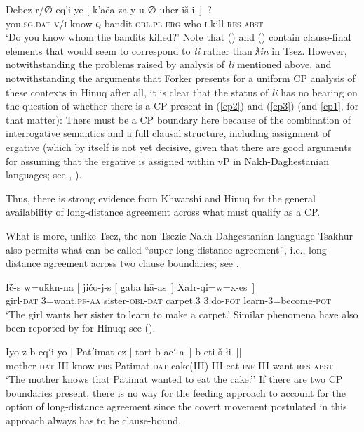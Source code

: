 \documentclass[output=paper
,modfonts
,nonflat]{langsci/langscibook}
\begin{document}
	\ea\label{ex:mueller:20} \label{cp3}
	\gll Debez r/∅-eq'i-ye [ k'a\v{c}a\textgamma -za-y \textbeltl u ∅-uher-i\v{s}-\textbeltl i~]~? \\
	you.{\scshape sg.dat} {\scshape v/i}-know-{\scshape q} {} bandit-{\scshape obl.pl-erg}   who {\scshape i}-kill-{\scshape res-abst} \\ 
	\glt `Do you know whom the bandits killed?'
	\z
	Note that (\LLast) and (\Last) contain clause-final elements that
	would seem to correspond to {\itshape {\l}i} rather than  {\it
		ƛin} in Tsez. However, notwithstanding the problems
	raised by  analysis of {\itshape {\l}i}
	mentioned above, and not\-withstanding the arguments that Forker
	presents for a uniform CP analysis of these contexts in Hinuq after
	all, it is clear that the status of {\itshape {\l}i} has no bearing on the
	question of whether there is a CP present in (\ref{cp2}) and (\ref{cp3})
	(and \ref{cp1}, for that matter): There must be a CP boundary here
	because of the combination of interrogative semantics and a full
	clausal structure, including assignment of ergative (which by itself
	is not yet decisive, given that there are good arguments for assuming
	that the ergative is assigned within vP in Nakh-Daghestanian
	languages; see \citealt{Gagliardietal:14}, \citealt{Polinsky:16:arc}). 
	
	Thus, there is strong evidence from Khwarshi and Hinuq for the general
	availability of long-distance agreement across what must qualify as a
	CP.
	
	What is more, unlike Tsez, the non-Tsezic Nakh-Dahgestanian language
	Tsakhur  also permits what can be called
	``super-long-distance agreement'', i.e., long-distance agreement 
	across two clause boundaries; see \citet{Kibrik:99}.
	
	\ea\label{ex:mueller:21} \label{tsa1}
	\gll I\v{c}\={\textsci}-s w=u\={k}\={\textsci}k\textbari n-na [ ji\v{c}o-j-s [ gaba  h\={a}\textglotstop-as~] XaIr-qi=w=x-es~] \\
	girl-\textsc{dat} {3}=want.\textsc{pf-{aa}} {} sister-\textsc{obl-dat} {} {carpet.3} 3.do-\textsc{pot} learn-{3}=become-\textsc{pot} \\
	\glt `The girl wants her sister to learn to make a carpet.'
	\z
	Similar phenomena have also been reported by \citet{Forker:11} for
	Hinuq; see (\Next).
	
	\ea \label{ex:mueller:22}\label{tsa2}
	\gll Iyo-z b-eq$'$i-yo [ Pat$'$imat-ez [ tort  b-ac$'$-a~] b-eti-\v{s}-\l i~]]\\
	mother-{\scshape dat} III-know-{\scshape prs} {} Patimat-{\scshape dat} {} cake(III) III-eat-{\scshape inf} III-want-{\scshape res}-{\scshape abst}\\
	\glt `The mother knows that Patimat wanted to eat the cake.''
	\z
	If there are two CP boundaries present, there is no way for the feeding approach
	to account for the option of long-distance agreement since the covert
	movement postulated in this approach always has to be
	clause-bound.
	
\end{document}
